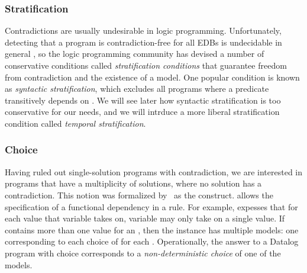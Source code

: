 \subsubsection{Stratification}
Contradictions are usually undesirable in logic programming. 
 
  Unfortunately, detecting that a program is contradiction-free for all EDBs is undecidable in general , so the logic programming community has devised a number of conservative conditions called {\em stratification conditions} that guarantee freedom from contradiction and the existence of a model.  One popular condition is known as {\em syntactic stratification}, which excludes all programs where a predicate  transitively depends on .  We will see later how syntactic stratification is too conservative for our needs, and we will intrduce a more liberal stratification condition called {\em temporal stratification}.

\subsubsection{Choice}
Having ruled out single-solution programs with contradiction, we are interested in programs that have a multiplicity of solutions, where no solution has a contradiction.  This notion was formalized by~\cite{greedychoice} as the  construct.   allows the specification of a functional dependency in a rule.  For example,  expesses that for each value that variable  takes on, variable  may only take on a single value.  If  contains more than one  value for an , then the instance has multiple models: one corresponding to each choice of  for each .  Operationally, the answer to a Datalog program with choice corresponds to a {\em non-deterministic choice} of one of the models.

